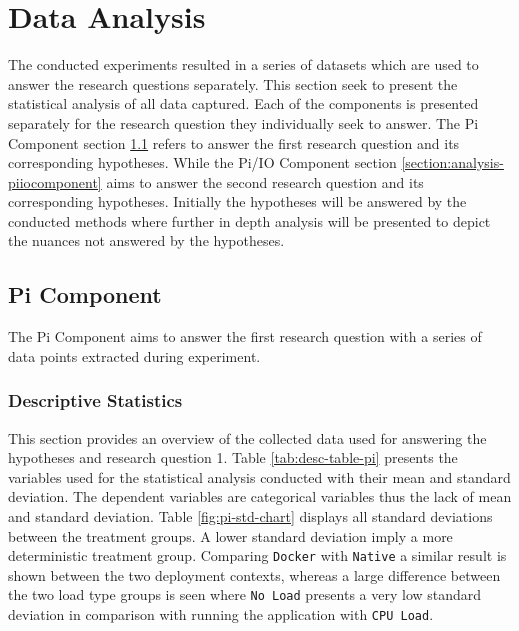 \iffalse  \fi
\chapter{Data Analysis}\label{section:data-analysis}

The conducted experiments resulted in a series of datasets which are used to answer the research questions separately. This section seek to present the statistical analysis of all data captured. Each of the components is presented separately for the research question they individually seek to answer. The Pi Component section \ref{section:analysis-picomponent} refers to answer the first research question and its corresponding hypotheses. While the Pi/IO Component section \ref{section:analysis-piiocomponent} aims to answer the second research question and its corresponding hypotheses. Initially the hypotheses will be answered by the conducted methods where further in depth analysis will be presented to depict the nuances not answered by the hypotheses.


\section{Pi Component}
\label{section:analysis-picomponent}

The Pi Component aims to answer the first research question with a series of data points extracted during experiment.


\subsection{Descriptive Statistics}

This section provides an overview of the collected data used for answering the hypotheses and research question 1. Table \ref{tab:desc-table-pi} presents the variables used for the statistical analysis conducted with their mean and standard deviation. The dependent variables are categorical variables thus the lack of mean and standard deviation. Table \ref{fig:pi-std-chart} displays all standard deviations between the treatment groups. A lower standard deviation imply a more deterministic treatment group. Comparing \texttt{Docker} with \texttt{Native} a similar result is shown between the two deployment contexts, whereas a large difference between the two load type groups is seen where \texttt{No Load} presents a very low standard deviation in comparison with running the application with \texttt{CPU Load}.


